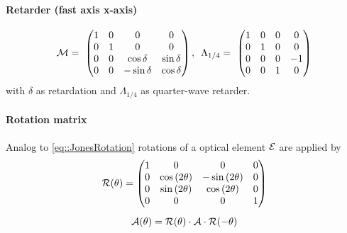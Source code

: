 \paragraph{Retarder (fast axis x-axis)}
\begin{align}
\mat{M}=\
\begin{pmatrix}
    1 & 0 & 0 &  0 \\
    0 & 1 & 0 &  0 \\
    0 & 0 & \cos \delta & \sin \delta \\
    0 & 0 & -\sin \delta &  \cos \delta
\end{pmatrix}
, \enspace
% 
\Lambda_{1/4}=\
\begin{pmatrix}
    1 & 0 & 0 &  0 \\
    0 & 1 & 0 &  0 \\
    0 & 0 & 0 & -1 \\
    0 & 0 & 1 &  0
\end{pmatrix}
\end{align}
with $\delta$ as retardation and $\Lambda_{1/4}$ as quarter-wave retarder.
%
\paragraph{Rotation matrix}
Analog to \cref{eq::JonesRotation} rotations of a optical element $\mathcal{E}$ are applied by
\begin{align}
\centering
\begin{gathered}
\mat{R}(\theta)=
\begin{pmatrix}
    1 &                0 &               0 & 0 \\
    0 & \cos{(2\theta)} & -\sin{(2\theta)} & 0 \\
    0 & \sin{(2\theta)} & \cos{(2\theta)} & 0 \\
    0 &                0 &               0 & 1
\end{pmatrix} \\[0.5em]
\mat{A}(\theta)
=\mat{R}(\theta )\cdot\mat{A}\cdot\mat{R}(-\theta )
\end{gathered}
\end{align}
%
%
%
